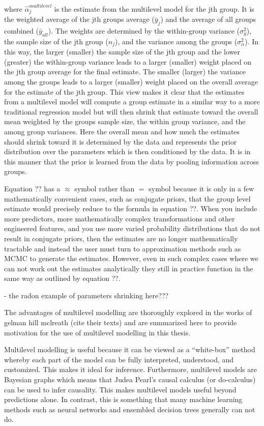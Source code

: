 where $\hat{\alpha}_j^{multilevel}$ is the estimate from the multilevel model for the jth group. It is the weighted average of the jth groups average ($\bar{y}_j$) and the average of all groups combined ($\bar{y}_{all}$). The weights are determined by the within-group variance ($\sigma_y^2$), the sample size of the jth group ($n_j$), and the variance among the groups ($\sigma_{\alpha}^2$). In this way, the larger (smaller) the sample size of the jth group and the lower (greater) the within-group variance leads to a larger (smaller) weight placed on the jth group average for the final estimate. The smaller (larger) the variance among the groups leads to a larger (smaller) weight placed on the overall average for the estimate of the jth group. This view makes it clear that the estimates from a multilevel model will compute a group estimate in a similar way to a more traditional regression model but will then shrink that estimate toward the overall mean weighted by the groups sample size, the within group variance, and the among group variances. Here the overall mean and how much the estimates should shrink toward it is determined by the data and represents the prior distribution over the parameters which is then conditioned by the data. It is in this manner that the prior is learned from the data by pooling information across groups.

Equation ?? has a $\approx$ symbol rather than $=$ symbol because it is only in a few mathematically convenient cases, such as conjugate priors, that the group level estimate would precisely reduce to the formula in equation ??. When you include more predictors, more mathematically complex transformations and other engineered features, and you use more varied probability distributions that do not result in conjugate priors, then the estimates are no longer mathematically tractable and instead the user must turn to approximation methods such as MCMC to generate the estimates. However, even in such complex cases where we can not work out the estimates analytically they still in practice function in the same way as outlined by equation ??.

- the radon example of parameters shrinking here???

The advantages of multilevel modelling are thoroughly explored in the works of gelman hill mclreath (cite their texts) and are summarized here to provide motivation for the use of multilevel modelling in this thesis.

Multilevel modelling is useful because it can be viewed as a “white-box” method whereby each part of the model can be fully interpreted, understood, and customized. This makes it ideal for inference. Furthermore, multilevel models are Bayesian graphs which means that Judea Pearl’s causal calculus (or do-calculus) can be used to infer causality. This makes multilevel models useful beyond predictions alone. In contrast, this is something that many machine learning methods such as neural networks and ensembled decision trees generally can not do.

